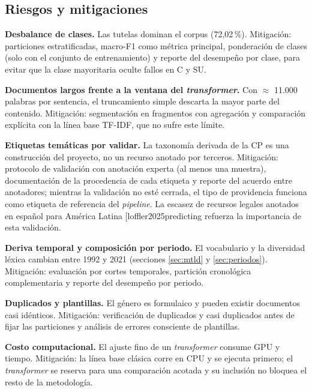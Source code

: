 \documentclass[11pt]{tg_usta}
\makeatletter
\renewcommand{\cite}{\@ifnextchar[{\@tempswatrue\@citex}{\@tempswafalse\@citex[]}}
\makeatother
\begin{document}
\subsection{Riesgos y mitigaciones}
\textbf{Desbalance de clases.} Las tutelas dominan el corpus (72,02\,\%). Mitigación: particiones estratificadas, macro-F1 como métrica principal, ponderación de clases (solo con el conjunto de entrenamiento) y reporte del desempeño por clase, para evitar que la clase mayoritaria oculte fallos en C y SU.

\textbf{Documentos largos frente a la ventana del \emph{transformer}.} Con $\approx$ 11.000 palabras por sentencia, el truncamiento simple descarta la mayor parte del contenido. Mitigación: segmentación en fragmentos con agregación y comparación explícita con la línea base TF-IDF, que no sufre este límite.

\textbf{Etiquetas temáticas por validar.} La taxonomía derivada de la CP es una construcción del proyecto, no un recurso anotado por terceros. Mitigación: protocolo de validación con anotación experta (al menos una muestra), documentación de la procedencia de cada etiqueta y reporte del acuerdo entre anotadores; mientras la validación no esté cerrada, el tipo de providencia funciona como etiqueta de referencia del \emph{pipeline}. La escasez de recursos legales anotados en español para América Latina \cite{loffler2025predicting} refuerza la importancia de esta validación.

\textbf{Deriva temporal y composición por periodo.} El vocabulario y la diversidad léxica cambian entre 1992 y 2021 (secciones \ref{sec:mtld} y \ref{sec:periodos}). Mitigación: evaluación por cortes temporales, partición cronológica complementaria y reporte del desempeño por periodo.

\textbf{Duplicados y plantillas.} El género es formulaico y pueden existir documentos casi idénticos. Mitigación: verificación de duplicados y casi duplicados antes de fijar las particiones y análisis de errores consciente de plantillas.

\textbf{Costo computacional.} El ajuste fino de un \emph{transformer} consume GPU y tiempo. Mitigación: la línea base clásica corre en CPU y se ejecuta primero; el \emph{transformer} se reserva para una comparación acotada y su inclusión no bloquea el resto de la metodología.
\end{document}
